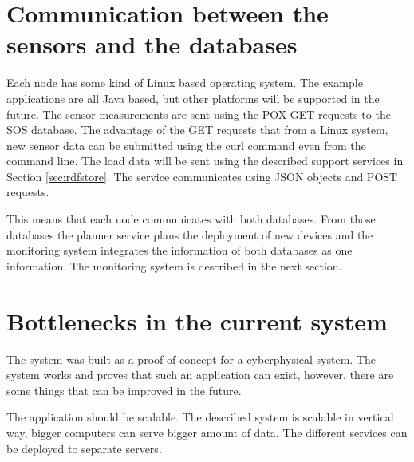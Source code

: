 \section{Communication between the sensors and the databases}

Each node has some kind of Linux based operating system. The example applications are all Java based, but other platforms will be supported in the future. The sensor measurements are sent using the POX GET requests to the SOS database. The advantage of the GET requests that from a Linux system, new sensor data can be submitted using the curl command even from the command line.  The load data will be sent using the described support services in Section \ref{sec:rdfstore}. The service communicates using JSON objects and POST requests.

This means that each node communicates with both databases. From those databases the planner service plans the deployment of new devices and the monitoring system integrates the information of both databases as one information. The monitoring system is described in the next section.

\section{Bottlenecks in the current system}

The system was built as a proof of concept for a cyberphysical system. The system works and proves that such an application can exist, however, there are some things that can be improved in the future. 

The application should be scalable. The described system is scalable in vertical way, bigger computers can serve bigger amount of data. The different services can be deployed to separate servers.
